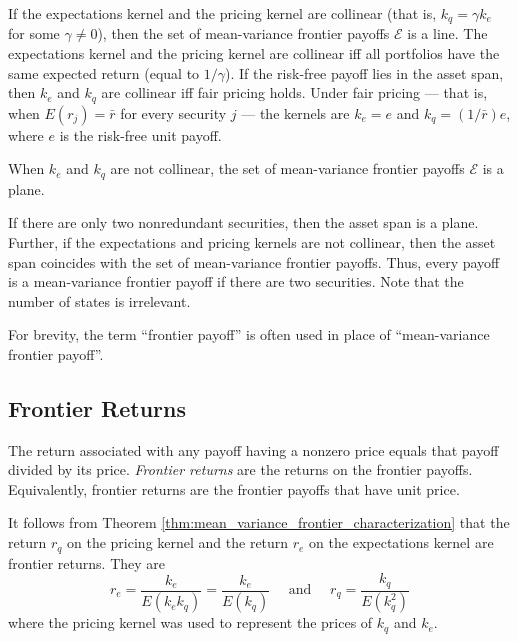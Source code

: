 \documentclass[\topdir/lecture\_notes.tex]{subfiles}
\begin{document}
If the expectations kernel and the pricing kernel are collinear (that is, \(k_{q}=\gamma k_{e}\) for some \(\gamma \neq 0\)), then the set of mean-variance frontier payoffs \(\mathcal{E}\) is a line. The expectations kernel and the pricing kernel are collinear iff all portfolios have the same expected return (equal to \(1/\gamma\)). If the risk-free payoff lies in the asset span, then \(k_{e}\) and \(k_{q}\) are collinear iff fair pricing holds. Under fair pricing --- that is, when \(E\left(r_{j}\right)=\bar{r}\) for every security \(j\) --- the kernels are \(k_{e}=e\) and \(k_{q}=(1/\bar{r}) e\), where \(e\) is the risk-free unit payoff.

When \(k_{e}\) and \(k_{q}\) are not collinear, the set of mean-variance frontier payoffs \(\mathcal{E}\) is a plane.

If there are only two nonredundant securities, then the asset span is a plane. Further, if the expectations and pricing kernels are not collinear, then the asset span coincides with the set of mean-variance frontier payoffs. Thus, every payoff is a mean-variance frontier payoff if there are two securities. Note that the number of states is irrelevant.

For brevity, the term ``frontier payoff'' is often used in place of ``mean-variance frontier payoff''.

\subsection{Frontier Returns}
The return associated with any payoff having a nonzero price equals that payoff divided by its price. \emph{Frontier returns} are the returns on the frontier payoffs. Equivalently, frontier returns are the frontier payoffs that have unit price.



It follows from Theorem \ref{thm:mean_variance_frontier_characterization} that the return \(r_{q}\) on the pricing kernel and the return \(r_{e}\) on the expectations kernel are frontier returns. They are
\begin{equation*}
r_{e}=\frac{k_{e}}{E\left(k_{e} k_{q}\right)}=\frac{k_{e}}{E\left(k_{q}\right)} \quad \text { and } \quad r_{q}=\frac{k_{q}}{E\left(k_{q}^{2}\right)} 
\end{equation*}
where the pricing kernel was used to represent the prices of \(k_{q}\) and \(k_{e}\).
\end{document}
